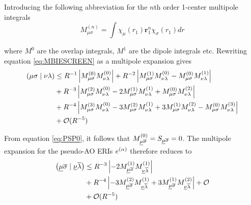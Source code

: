 \noindent Introducing the following abbreviation for the $n$th order 1-center multipole integrals
\begin{equation}
M^{(n)}_{\mu\sigma} = \int \chi_{\mu}(r_1) \mathbf{r}_1^n \chi_{\sigma}(r_1) dr
\end{equation}

\noindent where $M^{0}$ are the overlap integrals, $M^{1}$ are the dipole integrals etc. Rewriting equation \ref{eq:MBIESCREEN} as a multipole expansion gives
\newcommand{\mpole}[2]{M_{#1}^{(#2)}}
\begin{equation}
\begin{split}
\cn{\mu\sigma}{\nu\lambda} &\leq R^{-1} \left\lvert \mpole{\mu\sigma}{0} \mpole{\nu\lambda}{0} \right\rvert + R^{-2} \left\lvert \mpole{\mu\sigma}{1} \mpole{\nu\lambda}{0} - \mpole{\mu\sigma}{0} \mpole{\nu\lambda}{1} \right\rvert \\
&+ R^{-3} \left\lvert \mpole{\mu\sigma}{2} \mpole{\nu\lambda}{0} - 2 \mpole{\mu\sigma}{1} \mpole{\nu\lambda}{1} + \mpole{\mu\sigma}{0} \mpole{\nu\lambda}{2}\right\rvert \\
&+ R^{-4} \left\lvert \mpole{\mu\sigma}{3} \mpole{\nu\lambda}{0} - 3\mpole{\mu\sigma}{2} \mpole{\nu\lambda}{1} + 3\mpole{\mu\sigma}{1} \mpole{\nu\lambda}{2} - \mpole{\mu\sigma}{0} \mpole{\nu\lambda}{3}\right\rvert \\
&+ \mathcal{O}(R^{-5})
\end{split}
\end{equation}

From equation \ref{eq:PSP0}, it follows that $M_{\underline{\mu}\overline{\sigma}}^{(0)} = S_{\underline{\mu}\overline{\sigma}} = 0$. The multipole expansion for the pseudo-AO ERIs $e^{(\alpha)}$ therefore reduces to
\begin{equation}
\begin{split}
\cn{\ulgm\olgs}{\ulgn\olgl} &\leq R^{-3} \left\lvert - 2 \mpole{\ulgm\olgs}{1} \mpole{\ulgn\olgl}{1} \right\rvert \\
&+ R^{-4} \left\lvert - 3\mpole{\ulgm\olgs}{2} \mpole{\ulgn\olgl}{1} + 3\mpole{\ulgm\olgs}{1} \mpole{\ulgn\olgl}{2} \right\rvert + \mathcal{O} \\
&+ \mathcal{O}(R^{-5})
\end{split}
\end{equation}

